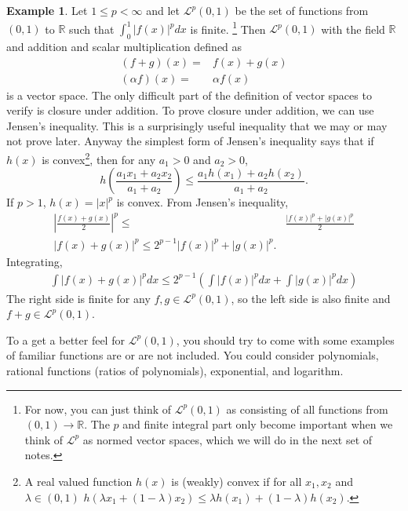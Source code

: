 \documentclass[12pt,reqno]{amsart}
\def\R{\mathbb{R}}
\theoremstyle{definition}
\newtheorem{example}{Example}[section]
\begin{document}
\begin{example}\label{ex:LP}
  Let $1 \leq p < \infty$ and let $\mathcal{L}^p(0,1)$ be the set of
  functions from $(0,1)$ to $\R$ such that $\int_0^1 |f(x)|^p dx$ is
  finite.
  \footnote{For now, you can just think of $\mathcal{L}^p(0,1)$ as
    consisting of all functions from $(0,1) \to \R$. The $p$ and finite
    integral part only become important when we think of $\mathcal{L}^p$
    as normed vector spaces, which we will do in the next set of notes.}
  Then $\mathcal{L}^p (0,1)$ with the field $\R$ and addition
  and scalar multiplication defined as
  \begin{align*}
    (f + g)(x) = & f(x) + g(x) \\
    (\alpha f)(x) = & \alpha f(x)
  \end{align*} 
  is a vector space.  The only difficult part of the definition of
  vector spaces to verify is closure under addition. To prove closure
  under addition, we can use Jensen's inequality. This is a
  surprisingly useful inequality that we may or may not prove
  later. Anyway the simplest form of Jensen's inequality says that if
  $h(x)$ is convex\footnote{A real valued function $h(x)$ is (weakly)
    convex if for all $x_1,x_2$ and $\lambda \in (0,1)$ $h(\lambda x_1
    + (1-\lambda) x_2) \leq \lambda h(x_1) + (1-\lambda) h(x_2)$.},
  then for any $a_1>0$ and $a_2>0$,
  \[ h\left(\frac{a_1 x_1 + a_2 x_2}{a_1 + a_2} \right) \leq \frac{a_1
    h(x_1) + a_2 h(x_2) }{a_1 + a_2}. \]
  If $p>1$, $h(x) = |x|^p$ is convex. From Jensen's inequality,
  \begin{align*}
    | \frac{f(x) + g(x)}{2} |^p \leq & \frac{|f(x)|^p + |g(x)|^p}{2}
    \\
    |f(x) + g(x) |^p \leq 2^{p-1} |f(x)|^p + |g(x)|^p. 
  \end{align*}
  Integrating,
  \begin{align*}
    \int |f(x) + g(x) |^p dx \leq 2^{p-1} \left(\int|f(x)|^p dx + \int
      |g(x)|^p dx \right)
  \end{align*}
  The right side is finite for any $f, g \in \mathcal{L}^p(0,1)$, so
  the left side is also finite and $f+g \in \mathcal{L}^p(0,1)$. 
  
  To a get a better feel for $\mathcal{L}^p(0,1)$, you should try to
  come with some examples of familiar functions are or are not
  included. You could consider polynomials, rational functions (ratios
  of polynomials), exponential, and logarithm.
\end{example}
\end{document}
